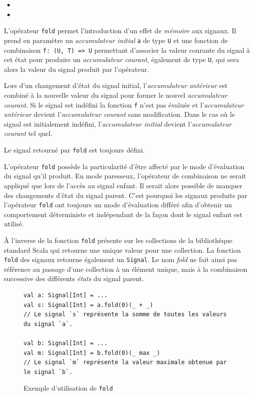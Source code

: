 \begin{itemize}
	\item {}
	\item {}
\end{itemize}

L'opérateur \texttt{fold} permet l'introduction d'un effet de \emph{mémoire} aux signaux. Il prend en paramètre un \emph{accumulateur initial} \texttt{a} de type \texttt{U} et une fonction de combinaison \texttt{f: (U, T) => U} permettant d'associer la valeur courante du signal à cet état pour produire un \emph{accumulateur courant}, également de type \texttt{U}, qui sera alors la valeur du signal produit par l'opérateur.

Lors d'un changement d'état du signal initial, l'\emph{accumulateur antérieur} est combiné à la nouvelle valeur du signal pour former le nouvel \emph{accumulateur courant}. Si le signal est indéfini la fonction \texttt{f} n'est pas évaluée et l'\emph{accumulateur antérieur} devient l'\emph{accumulateur courant} sans modification. Dans le cas où le signal est initialement indéfini, l'\emph{accumulateur initial} devient l'\emph{accumulateur courant} tel quel.

Le signal retourné par \texttt{fold} est toujours défini.

L'opérateur \texttt{fold} possède la particularité d'être affecté par le mode d'évaluation du signal qu'il produit. En mode paresseux, l'opérateur de combinaison ne serait appliqué que lors de l'accès au signal enfant. Il serait alors possible de manquer des changements d'état du signal parent. C'est pourquoi les signaux produits par l'opérateur \texttt{fold} ont toujours un mode d'évaluation différé afin d'obtenir un comportement déterministe et indépendant de la façon dont le signal enfant est utilisé.

À l'inverse de la fonction \texttt{fold} présente sur les collections de la bibliothèque standard Scala qui retourne une unique valeur pour une collection. La fonction \texttt{fold} des signaux retourne également un \texttt{Signal}. Le nom \emph{fold} ne fait ainsi pas référence au passage d'une collection à un élément unique, mais à la combinaison successive des différents \emph{états} du signal parent.

\begin{figure}[h]
	\begin{lstlisting}
val a: Signal[Int] = ...
val s: Signal[Int] = a.fold(0)(_ + _)
// Le signal `s` représente la somme de toutes les valeurs du signal `a`.

val b: Signal[Int] = ...
val m: Signal[Int] = b.fold(0)(_ max _)
// Le signal `m` représente la valeur maximale obtenue par le signal `b`.
	\end{lstlisting}
	\caption{Exemple d'utilisation de \texttt{fold}}
\end{figure}

